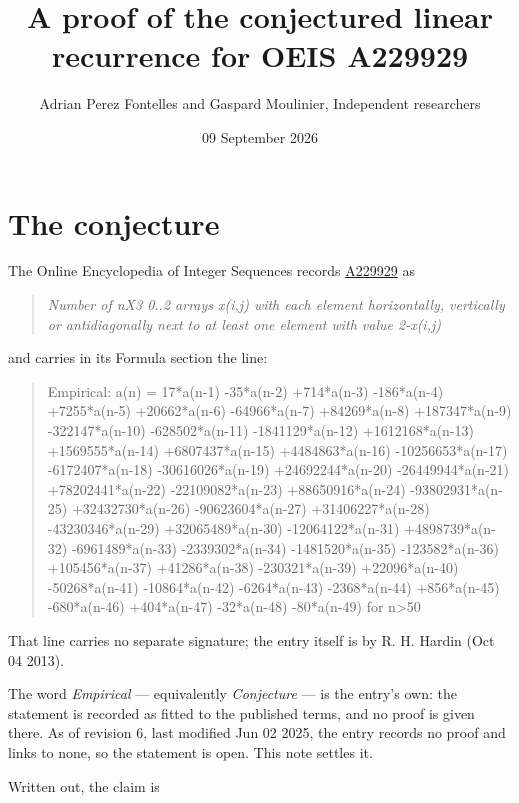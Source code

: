 \documentclass[11pt]{article}
\title{A proof of the conjectured linear recurrence for OEIS A229929}
\author{Adrian Perez Fontelles and Gaspard Moulinier, Independent researchers}
\date{09 September 2026}
\theoremstyle{definition}
\begin{document}
\maketitle
\section{The conjecture}

The Online Encyclopedia of Integer Sequences records \href{https://oeis.org/A229929}{A229929} as

\begin{quote}\itshape Number of nX3 0..2 arrays x(i,j) with each element horizontally, vertically or antidiagonally next to at least one element with value 2-x(i,j)\end{quote}

and carries in its Formula section the line:

\begin{quote}\ttfamily Empirical: a(n) = 17*a(n-1) -35*a(n-2) +714*a(n-3) -186*a(n-4) +7255*a(n-5) +20662*a(n-6) -64966*a(n-7) +84269*a(n-8) +187347*a(n-9) -322147*a(n-10) -628502*a(n-11) -1841129*a(n-12) +1612168*a(n-13) +1569555*a(n-14) +6807437*a(n-15) +4484863*a(n-16) -10256653*a(n-17) -6172407*a(n-18) -30616026*a(n-19) +24692244*a(n-20) -26449944*a(n-21) +78202441*a(n-22) -22109082*a(n-23) +88650916*a(n-24) -93802931*a(n-25) +32432730*a(n-26) -90623604*a(n-27) +31406227*a(n-28) -43230346*a(n-29) +32065489*a(n-30) -12064122*a(n-31) +4898739*a(n-32) -6961489*a(n-33) -2339302*a(n-34) -1481520*a(n-35) -123582*a(n-36) +105456*a(n-37) +41286*a(n-38) -230321*a(n-39) +22096*a(n-40) -50268*a(n-41) -10864*a(n-42) -6264*a(n-43) -2368*a(n-44) +856*a(n-45) -680*a(n-46) +404*a(n-47) -32*a(n-48) -80*a(n-49) for n>50\end{quote}

That line carries no separate signature; the entry itself is by R. H. Hardin (Oct 04 2013).

The word {\itshape Empirical} --- equivalently {\itshape Conjecture} --- is the entry's own: the statement is recorded as fitted to the published terms, and no proof is given there. As of revision 6, last modified Jun 02 2025, the entry records no proof and links to none, so the statement is open. This note settles it.

Written out, the claim is
\end{document}
